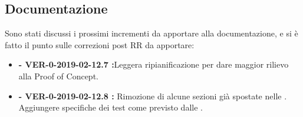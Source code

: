 \documentclass[a4paper, oneside, openany, dvipsnames, table]{article}
\begin{document}
\subsection{Documentazione}
Sono stati discussi i prossimi incrementi da apportare alla documentazione, e si è fatto il punto sulle correzioni post RR da apportare:
\begin{itemize}
	\item \textbf{\PdP  - VER-0-2019-02-12.7 :}Leggera ripianificazione per dare maggior rilievo alla Proof of Concept.
	\item \textbf{\PdQ  - VER-0-2019-02-12.8 : }Rimozione di alcune sezioni già spostate nelle \NdP. Aggiungere specifiche dei test come previsto dalle \NdP .
\end{itemize}
\end{document}
